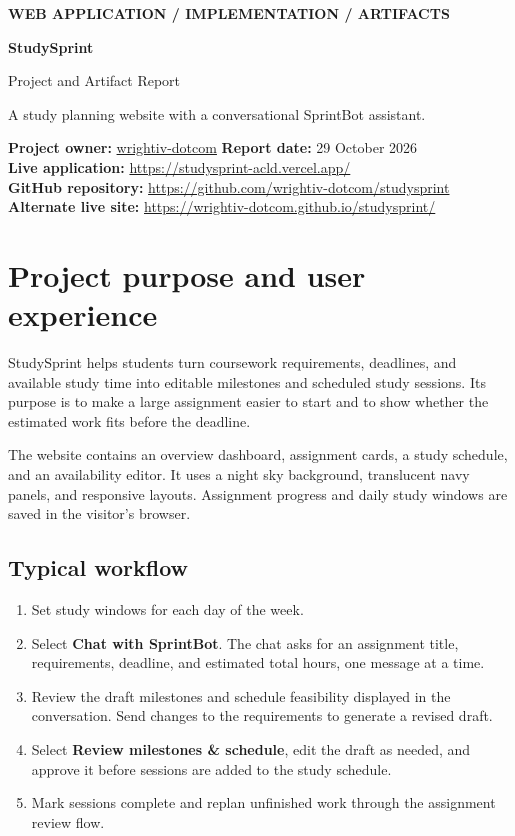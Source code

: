 \documentclass[11pt,letterpaper]{article}
\begin{document}
{\color{blue}\small\bfseries WEB APPLICATION / IMPLEMENTATION / ARTIFACTS}\par
{\Huge\bfseries\color{navy}StudySprint}\par
{\Large Project and Artifact Report}\par
{\color{gray}A study planning website with a conversational SprintBot assistant.}

\colorbox{pale}{\parbox{\dimexpr\linewidth-2\fboxsep}{\textbf{Project owner:} \href{https://github.com/wrightiv-dotcom}{wrightiv-dotcom}\quad
\textbf{Report date:} 29 October 2026\\[4pt]
\textbf{Live application:} \url{https://studysprint-acld.vercel.app/}\\
\textbf{GitHub repository:} \url{https://github.com/wrightiv-dotcom/studysprint}\\
\textbf{Alternate live site:} \url{https://wrightiv-dotcom.github.io/studysprint/}}}

\section{Project purpose and user experience}
StudySprint helps students turn coursework requirements, deadlines, and available study time into editable milestones and scheduled study sessions. Its purpose is to make a large assignment easier to start and to show whether the estimated work fits before the deadline.

The website contains an overview dashboard, assignment cards, a study schedule, and an availability editor. It uses a night sky background, translucent navy panels, and responsive layouts. Assignment progress and daily study windows are saved in the visitor's browser.

\subsection{Typical workflow}
\begin{enumerate}
\item Set study windows for each day of the week.
\item Select \textbf{Chat with SprintBot}. The chat asks for an assignment title, requirements, deadline, and estimated total hours, one message at a time.
\item Review the draft milestones and schedule feasibility displayed in the conversation. Send changes to the requirements to generate a revised draft.
\item Select \textbf{Review milestones \& schedule}, edit the draft as needed, and approve it before sessions are added to the study schedule.
\item Mark sessions complete and replan unfinished work through the assignment review flow.
\end{enumerate}
\end{document}
